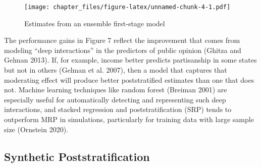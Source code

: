 \documentclass[
]{article}
\newenvironment{Shaded}{\begin{snugshade}}{\end{snugshade}}
\newcommand{\AttributeTok}[1]{\textcolor[rgb]{0.77,0.63,0.00}{#1}}
\newcommand{\CommentTok}[1]{\textcolor[rgb]{0.56,0.35,0.01}{\textit{#1}}}
\newcommand{\FunctionTok}[1]{\textcolor[rgb]{0.00,0.00,0.00}{#1}}
\newcommand{\NormalTok}[1]{#1}
\newcommand{\OtherTok}[1]{\textcolor[rgb]{0.56,0.35,0.01}{#1}}
\newcommand{\SpecialCharTok}[1]{\textcolor[rgb]{0.00,0.00,0.00}{#1}}
\begin{document}
\begin{Shaded}
\end{Shaded}

\begin{figure}
\centering
\texttt{[image: chapter\_files/figure-latex/unnamed-chunk-4-1.pdf]}
\caption{Estimates from an ensemble first-stage model}
\end{figure}

The performance gains in Figure 7 reflect the improvement that comes
from modeling ``deep interactions'' in the predictors of public opinion
(Ghitza and Gelman 2013). If, for example, income better predicts
partisanship in some states but not in others (Gelman et al. 2007), then
a model that captures that moderating effect will produce better
poststratified estimates than one that does not. Machine learning
techniques like random forest (Breiman 2001) are especially useful for
automatically detecting and representing such deep interactions, and
stacked regression and poststratification (SRP) tends to outperform MRP
in simulations, particularly for training data with large sample size
(Ornstein 2020).

\hypertarget{synthetic-poststratification}{%
\subsection{Synthetic
Poststratification}\label{synthetic-poststratification}}
\end{document}

